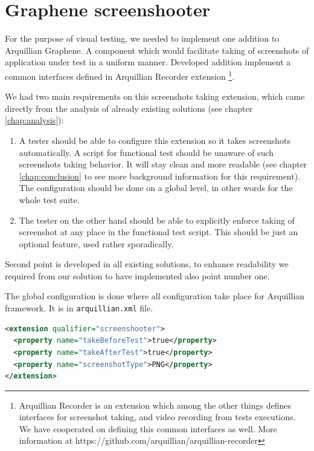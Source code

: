\documentclass[11pt,oneside,final]{fithesis2}
\begin{document}
\section{Graphene screenshooter}
For the purpose of visual testing, we needed to implement one addition to Arquillian Graphene. 
A component which would facilitate taking of screenshots of application under test in a uniform manner.
Developed addition implement a common interfaces defined in Arquillian Recorder extension
\footnote{Arquillian Recorder is an extension which among the other things defines interfaces 
for screenshot taking, and video recording from tests executions. We have cooperated on defining this
common interfaces as well. More information at https://github.com/arquillian/arquillian-recorder}.

We had two main requirements on this screenshots taking extension, which came directly from the analysis of
already existing solutions (see chapter \ref{chap:analysis}):

\begin{enumerate}
 \item A tester should be able to configure this extension so it takes screenshots automatically. A script
 for functional test should be unaware of such screenshots taking behavior. It will stay clean and more 
 readable (see chapter \ref{chap:conclusion} to see more background information for this requirement).
 The configuration should be done on a global level, in other words for the whole test suite.
 \item The tester on the other hand should be able to explicitly enforce taking of screenshot at any place
 in the functional test script. This should be just an optional feature, used rather sporadically.
\end{enumerate}

Second point is developed in all existing solutions, to enhance readability we required from our solution
to have implemented also point number one.

The global configuration is done where all configuration take place for Arquillian framework. 
It is in \texttt{arquillian.xml} file.

\begin{lstlisting}[caption=Example of screenshooter configuration in arquillian.xml,label=lis:screenshooterconf,language=xml]
<extension qualifier="screenshooter">
  <property name="takeBeforeTest">true</property>
  <property name="takeAfterTest">true</property>
  <property name="screenshotType">PNG</property>
</extension>
\end{lstlisting}
\end{document}
